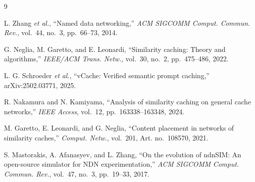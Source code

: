 \documentclass[12pt,a4paper]{article}
\begin{document}
\vspace{-0.8em}
{\small
\begin{thebibliography}{9}
\setlength{\itemsep}{1pt}

L. Zhang \textit{et al.}, ``Named data networking,'' \textit{ACM SIGCOMM Comput. Commun. Rev.},
vol.~44, no.~3, pp.~66--73, 2014.

G. Neglia, M. Garetto, and E. Leonardi, ``Similarity caching: Theory and algorithms,''
\textit{IEEE/ACM Trans. Netw.}, vol.~30, no.~2, pp.~475--486, 2022.

L. G. Schroeder \textit{et al.}, ``vCache: Verified semantic prompt caching,'' arXiv:2502.03771,
2025.

R. Nakamura and N. Kamiyama, ``Analysis of similarity caching on general cache networks,''
\textit{IEEE Access}, vol.~12, pp.~163338--163348, 2024.

M. Garetto, E. Leonardi, and G. Neglia, ``Content placement in networks of similarity caches,''
\textit{Comput. Netw.}, vol.~201, Art. no.~108570, 2021.

S. Mastorakis, A. Afanasyev, and L. Zhang, ``On the evolution of ndnSIM: An open-source simulator
for NDN experimentation,'' \textit{ACM SIGCOMM Comput. Commun. Rev.}, vol.~47, no.~3,
pp.~19--33, 2017.

\end{thebibliography}
}
\end{document}
